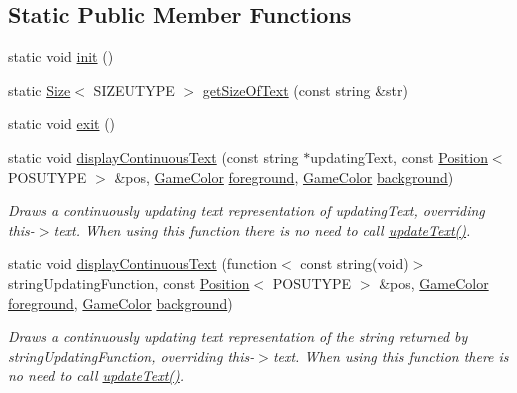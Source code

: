 \subsection*{Static Public Member Functions}
\begin{DoxyCompactItemize}
\item 
static void \hyperlink{class_text_output_ae5f21f4ba09be0b403967268b7ef0ad7}{init} ()
\item 
static \hyperlink{struct_size}{Size}$<$ S\-I\-Z\-E\-U\-T\-Y\-P\-E $>$ \hyperlink{class_text_output_a0ec07dd71eac9a1dd1622e506bd49377}{get\-Size\-Of\-Text} (const string \&str)
\item 
static void \hyperlink{class_text_output_adc94b706e632c9e2b1d62f5756dfbbb5}{exit} ()
\item 
static void \hyperlink{class_text_output_ac1c4bc687c2007648a18d3c76ee828f6}{display\-Continuous\-Text} (const string $\ast$updating\-Text, const \hyperlink{struct_position}{Position}$<$ P\-O\-S\-U\-T\-Y\-P\-E $>$ \&pos, \hyperlink{struct_game_color}{Game\-Color} \hyperlink{class_text_output_a969669fc87e0828685b6b20c4bb79616}{foreground}, \hyperlink{struct_game_color}{Game\-Color} \hyperlink{class_text_output_a1d58e4651de9d729bdc19f143b2bb042}{background})
\begin{DoxyCompactList}\small\item\em Draws a continuously updating text representation of updating\-Text, overriding this-\/$>$text. When using this function there is no need to call \hyperlink{class_text_output_a9981707e972ac76a7bb7adb65201a84a}{update\-Text()}. \end{DoxyCompactList}\item 
static void \hyperlink{class_text_output_a06a756cc49331463a0e4dd8c4bf57e09}{display\-Continuous\-Text} (function$<$ const string(void)$>$ string\-Updating\-Function, const \hyperlink{struct_position}{Position}$<$ P\-O\-S\-U\-T\-Y\-P\-E $>$ \&pos, \hyperlink{struct_game_color}{Game\-Color} \hyperlink{class_text_output_a969669fc87e0828685b6b20c4bb79616}{foreground}, \hyperlink{struct_game_color}{Game\-Color} \hyperlink{class_text_output_a1d58e4651de9d729bdc19f143b2bb042}{background})
\begin{DoxyCompactList}\small\item\em Draws a continuously updating text representation of the string returned by string\-Updating\-Function, overriding this-\/$>$text. When using this function there is no need to call \hyperlink{class_text_output_a9981707e972ac76a7bb7adb65201a84a}{update\-Text()}. \end{DoxyCompactList}\end{DoxyCompactItemize}
